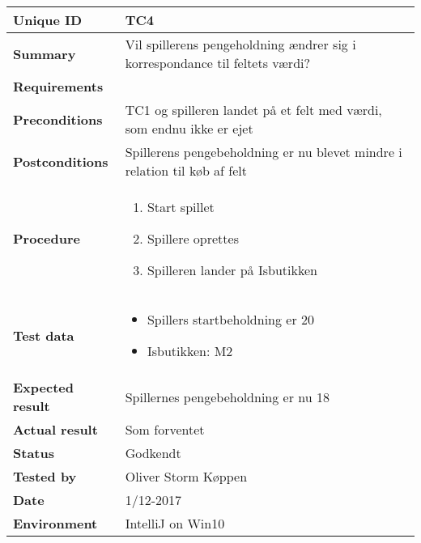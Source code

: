 \begin{table}[H]
    \begin{center}
        \begin{tabular}{|l|p{8cm}|}
            \hline
            \textbf{Unique ID} & TC4 \\
            \hline
            \textbf{Summary} & Vil spillerens pengeholdning ændrer sig i korrespondance til feltets værdi? \\
            \hline
            \textbf{Requirements} & \\
            \hline
            \textbf{Preconditions} & TC1 og spilleren landet på et felt med værdi, som endnu ikke er ejet \\
            \hline
            \textbf{Postconditions} & Spillerens pengebeholdning er nu blevet mindre i relation til køb af felt\\
            \hline
            \textbf{Procedure} & \begin{enumerate}
                \setlength\itemsep{0ex}
                \item Start spillet
                \item Spillere oprettes
                \item Spilleren lander på Isbutikken
            \end{enumerate} \\
            \hline
            \textbf{Test data} & \begin{itemize}
                \setlength\itemsep{0ex}
                \item Spillers startbeholdning er 20
                \item Isbutikken: M2
            \end{itemize} \\
            \hline
            \textbf{Expected result} & Spillernes pengebeholdning er nu 18\\
            \hline
            \textbf{Actual result} & Som forventet \\
            \hline
            \textbf{Status} & Godkendt \\
            \hline
            \textbf{Tested by} & Oliver Storm Køppen \\
            \hline
            \textbf{Date} & 1/12-2017 \\
            \hline
            \textbf{Environment} & IntelliJ on Win10 \\
            \hline
        \end{tabular}
    \end{center}
\end{table}
